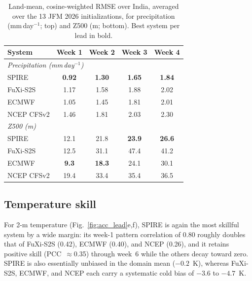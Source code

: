 \documentclass[11pt]{article}
\begin{document}
\begin{table}[t]
  \centering
  \caption{Land-mean, cosine-weighted RMSE over India, averaged over the
  13 JFM 2026 initializations, for precipitation (mm\,day$^{-1}$; top)
  and Z500 (m; bottom). Best system per lead in bold.}
  \label{tab:rmse}
  \begin{tabular}{lcccc}
    \toprule
    System & Week 1 & Week 2 & Week 3 & Week 4 \\
    \midrule
    \multicolumn{5}{l}{\emph{Precipitation (mm\,day$^{-1}$)}}\\
    SPIRE        & \textbf{0.92} & \textbf{1.30} & \textbf{1.65} & \textbf{1.84} \\
    FuXi-S2S     & 1.17 & 1.58 & 1.88 & 2.02 \\
    ECMWF        & 1.05 & 1.45 & 1.81 & 2.01 \\
    NCEP CFSv2   & 1.46 & 1.81 & 2.03 & 2.30 \\
    \midrule
    \multicolumn{5}{l}{\emph{Z500 (m)}}\\
    SPIRE        & 12.1 & 21.8 & \textbf{23.9} & \textbf{26.6} \\
    FuXi-S2S     & 12.5 & 31.1 & 47.4 & 41.2 \\
    ECMWF        & \textbf{9.3} & \textbf{18.3} & 24.1 & 30.1 \\
    NCEP CFSv2   & 19.4 & 33.4 & 35.4 & 36.5 \\
    \bottomrule
  \end{tabular}
\end{table}

\subsection{Temperature skill}\label{sec:t2m_skill}

For 2-m temperature (Fig.~\ref{fig:acc_lead}e,f), SPIRE is again the most
skillful system by a wide margin: its week-1 pattern correlation of 0.80
roughly doubles that of FuXi-S2S (0.42), ECMWF (0.40), and NCEP (0.26),
and it retains positive skill (PCC~$\approx$0.35) through week~6 while
the others decay toward zero. SPIRE is also essentially unbiased in the
domain mean ($-0.2$~K), whereas FuXi-S2S, ECMWF, and NCEP each carry a
systematic cold bias of $-3.6$ to $-4.7$~K.
\end{document}
